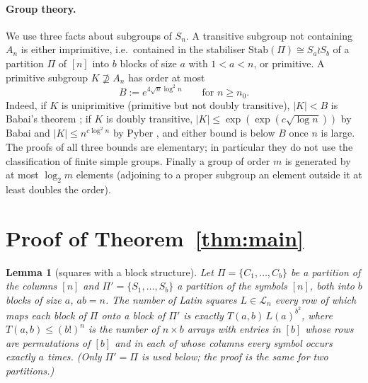\documentclass[11pt]{amsart}
\theoremstyle{plain}
\newtheorem{lemma}[theorem]{Lemma}
\theoremstyle{remark}
\newcommand{\Stab}{\mathrm{Stab}}
\newcommand{\LL}{\mathcal{L}}
\begin{document}
\paragraph{Group theory.}  We use three facts about subgroups of $S_n$.
A transitive subgroup not containing $A_n$ is either imprimitive, i.e.\
contained in the stabiliser $\Stab(\Pi)\cong S_a\wr S_b$ of a partition
$\Pi$ of $[n]$ into $b$ blocks of size $a$ with $1<a<n$, or primitive.
A primitive subgroup $K\not\supseteq A_n$ has order at most
\[
B:=e^{4\sqrt n\log^2n}\qquad\text{for }n\ge n_0.
\]
Indeed, if $K$ is uniprimitive (primitive but not doubly transitive),
$|K|<B$ is Babai's theorem \cite{Bab81}; if $K$ is doubly transitive,
$|K|\le\exp(\exp(c\sqrt{\log n}))$ by Babai \cite{Bab82} and
$|K|\le n^{c\log^2n}$ by Pyber \cite{Pyb93b}, and either bound is below
$B$ once $n$ is large.  The proofs of all three bounds are elementary;
in particular they do not use the classification of finite simple
groups.  Finally a group of order $m$ is generated by at most $\log_2m$
elements (adjoining to a proper subgroup an element outside it at least
doubles the order).

\section{Proof of Theorem~\ref{thm:main}}

\begin{lemma}[squares with a block structure]\label{lem:block}
Let $\Pi=\{C_1,\dots,C_b\}$ be a partition of the columns $[n]$ and
$\Pi'=\{S_1,\dots,S_b\}$ a partition of the symbols $[n]$, both into $b$
blocks of size $a$, $ab=n$.  The number of Latin squares $L\in\LL_n$
every row of which maps each block of $\Pi$ onto a block of $\Pi'$ is
exactly $T(a,b)\,L(a)^{b^2}$, where $T(a,b)\le(b!)^n$ is the number of
$n\times b$ arrays with entries in $[b]$ whose rows are permutations of
$[b]$ and in each of whose columns every symbol occurs exactly $a$
times.  (Only $\Pi'=\Pi$ is used below; the proof is the same for two
partitions.)
\end{lemma}
\end{document}
